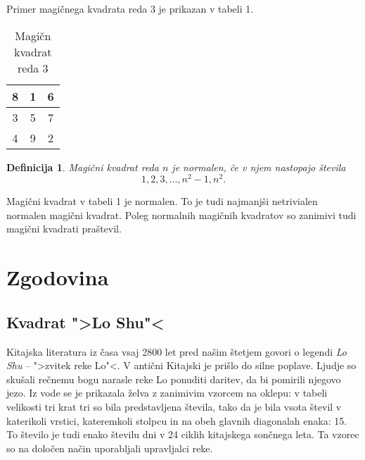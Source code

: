 \documentclass[a4paper,12pt]{article}
\newtheorem{definition}{Definicija}
\begin{document}
Primer magičnega kvadrata reda 3 je prikazan v tabeli 1.

\begin{table}[h]
   \centering
   \caption{Magičn kvadrat reda 3}
   \label{table:mag3}
   \begin{tabular}{|c|c|c|}
      \hline
      8 & 1 & 6 \\
      \hline
      3 & 5 & 7 \\
      \hline
      4 & 9 & 2 \\
      \hline
   \end{tabular}
      

   
\end{table}

\begin{definition}
   Magični kvadrat reda $n$ je \emph{normalen}, če v njem nastopajo števila
   \begin{equation}
      1, 2, 3, \ldots, n^2-1, n^2.
   \end{equation}
\end{definition}   

Magični kvadrat v tabeli 1 je normalen.
To je tudi najmanjši netrivialen normalen magični kvadrat.
Poleg normalnih magičnih kvadratov so zanimivi tudi magični kvadrati praštevil.


\section{Zgodovina}

\subsection{Kvadrat ">Lo Shu"<}

Kitajska literatura iz časa vsaj 2800 let pred našim štetjem govori o legendi
\emph{Lo Shu} -- ">zvitek reke Lo"<. V antični Kitajski je prišlo do
silne poplave. Ljudje so skušali rečnemu bogu narasle reke Lo ponuditi daritev,
da bi pomirili njegovo jezo. Iz vode se je prikazala želva z zanimivim vzorcem
na oklepu: v tabeli velikosti tri krat tri so bila predstavljena števila, tako
da je bila vsota števil v katerikoli vrstici, kateremkoli stolpcu in na obeh
glavnih diagonalah enaka: 15. To število je tudi enako številu dni v 24 ciklih
kitajskega sončnega leta. Ta vzorec so na določen način uporabljali upravljalci
reke.
\end{document}
